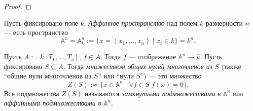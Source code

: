 \documentclass[12pt,a4paper]{article}
\newcommand{\Ker}{\mathrm{Ker}}
\renewcommand{\AA}{\ensuremath{\mathbb{A}}\xspace}
\begin{document}
\begin{proof}


    \end{proof}

    \begin{definition}
        Пусть фиксировано поле $k$. \emph{Аффинное пространство} над полем $k$ размерности $n$ --- есть пространство
        \[\AA^n = \AA_k^n := \{x = (x_1, \dots, x_n) \mid x_i \in k\} = k^n.\]

        Пусть $A := k[T_1, \dots, T_n]$, $f \in A$. Тогда $f$ --- отображение $\AA^n \to k$. Пусть фиксировано $S \subseteq A$. Тогда \emph{множеством общих нулей многочленов из $S$} (также ``общие нули многочленов из $S$'' или ``нули $S$'') --- это множество
        \[Z(S) := \{x \in \AA^n \mid \forall f \in S\; f(x) = 0\}.\]
        Все подмножества $Z(S)$ называются \emph{замкнутыми подмножествами в $\AA^n$} или \emph{аффинными подмножествами в $\AA^n$}.
    \end{definition}
\end{document}
